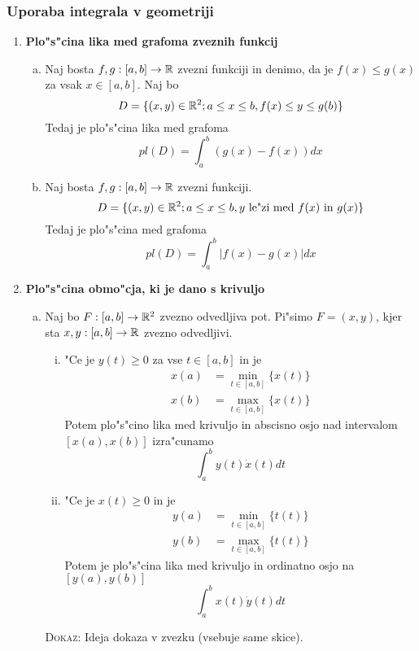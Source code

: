 \subsubsection{Uporaba integrala v geometriji}
\begin{enumerate}
	\item \textbf{Plo"s"cina lika med grafoma zveznih funkcij}
	\begin{enumerate}[(a)]
		\item Naj bosta $f, g: [a, b] \to \mathbb{R}$ zvezni funkciji in denimo, da je $f(x) \leq g(x)$ za vsak $x \in [a, b]$. Naj bo
		\begin{equation*}
		D = \{(x, y) \in \mathbb{R}^2; a \leq x \leq b, f(x) \leq y \leq g(b)\}
		\end{equation*}
		Tedaj je plo"s"cina lika med grafoma
		\begin{equation*}
		pl(D) = \int_a^b (g(x) - f(x)) dx
		\end{equation*}
		
		\item Naj bosta $f, g: [a, b] \to \mathbb{R}$ zvezni funkciji.
		\begin{equation*}
		D = \{(x, y) \in \mathbb{R}^2; a \leq x \leq b, \text{$y$ le"zi med $f(x)$ in $g(x)$}\}
		\end{equation*}
		Tedaj je plo"s"cina med grafoma
		\begin{equation*}
		pl(D) = \int_a^b |f(x) - g(x)| dx
		\end{equation*}
	\end{enumerate}

	\item \textbf{Plo"s"cina obmo"cja, ki je dano s krivuljo}
	\begin{enumerate}[(a)]
		\item Naj bo $F: [a, b] \to \mathbb{R}^2$ zvezno odvedljiva pot. Pi"simo $F = (x, y)$, kjer sta $x, y: [a, b] \to \mathbb{R}$ zvezno odvedljivi.
		\begin{enumerate}[(i)]
			\item "Ce je $y(t) \geq 0$ za vse $t \in [a, b]$ in je 
			\begin{align*}
			x(a) &= \min_{t \in [a, b]} \{x(t)\} \\
			x(b) &= \max_{t \in [a, b]} \{x(t)\}
			\end{align*}
			Potem plo"s"cino lika med krivuljo in abscisno osjo nad intervalom $[x(a), x(b)]$ izra"cunamo
			\begin{equation*}
			\int_a^b y(t) \dot{x}(t) dt
			\end{equation*}
			
			\item "Ce je $x(t)\geq 0$ in je 
			\begin{align*}
			y(a) &= \min_{t \in [a, b]} \{t(t)\} \\
			y(b) &= \max_{t \in [a, b]} \{t(t)\}
			\end{align*}
			Potem je plo"s"cina lika med krivuljo in ordinatno osjo na $[y(a), y(b)]$
			\begin{equation*}
			\int_a^b x(t) \dot{y}(t) dt
			\end{equation*}
		\end{enumerate}
		\textsc{Dokaz:} Ideja dokaza v zvezku (vsebuje same skice).
	\end{enumerate}
\end{enumerate}
